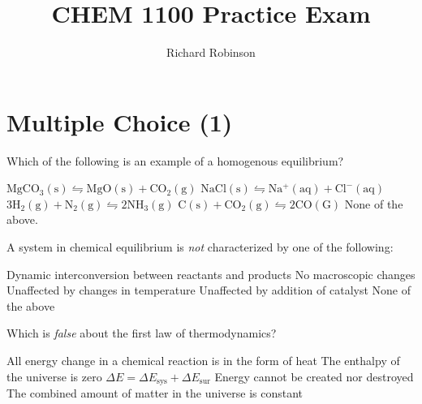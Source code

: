 \documentclass[answers]{exam}
\title{CHEM 1100 Practice Exam}
\author{Richard Robinson}
\begin{document}
\begin{center}
\end{center}
\setlength\columnsep{20pt}


\section{Multiple Choice (1)}
\begin{multicols}{2}
\begin{questions}

\question Which of the following is an example of a homogenous equilibrium?

\begin{choices}
 \choice $\mathrm{MgCO_3(s) \leftrightharpoons MgO(s) + CO_2(g)}$
 \choice $\mathrm{NaCl(s) \leftrightharpoons Na^+(aq) + Cl^-(aq)}$
 \CorrectChoice $\mathrm{3H_2(g) + N_2(g) \leftrightharpoons 2NH_3(g)}$
 \choice $\mathrm{C(s) + CO_2(g) \leftrightharpoons 2CO(G)}$
 \choice None of the above.
\end{choices}

\question A system in chemical equilibrium is \emph{not} characterized by one of the following:

\begin{choices}
  \choice Dynamic interconversion between reactants and products
  \choice No macroscopic changes
  \CorrectChoice Unaffected by changes in temperature
  \choice Unaffected by addition of catalyst
  \choice None of the above
\end{choices}

\question Which is \emph{false} about the first law of thermodynamics?

\begin{choices}
  \choice All energy change in a chemical reaction is in the form of heat
  \choice The enthalpy of the universe is zero
  \choice $\Delta E = \Delta E_\text{sys} + \Delta E_{\text{sur}}$
  \choice Energy cannot be created nor destroyed
  \choice The combined amount of matter in the universe is constant
\end{choices}


\end{questions}
\end{multicols}
\end{document}
